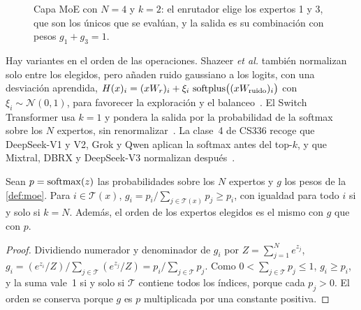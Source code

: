 \begin{figure}[ht]
\centering
{}
\caption{Capa MoE con $N=4$ y $k=2$: el enrutador elige los expertos 1 y 3, que son los únicos que se evalúan, y la salida es su combinación con pesos $g_1+g_3=1$.}
\label{fig:moe}
\end{figure}

Hay variantes en el orden de las operaciones. Shazeer \emph{et al.} también normalizan solo entre los elegidos, pero añaden ruido gaussiano a los logits, con una desviación aprendida, $H(x)_i=(xW_r)_i+\xi_i\,\operatorname{softplus}\bigl((xW_{\mathrm{ruido}})_i\bigr)$ con $\xi_i\sim\mathcal N(0,1)$, para favorecer la exploración y el balanceo~\cite[§2.1]{shazeer2017}. El Switch Transformer usa $k=1$ y pondera la salida por la probabilidad de la softmax sobre los $N$ expertos, sin renormalizar~\cite[§2.1]{switch}. La clase~4 de CS336 recoge que DeepSeek-V1 y V2, Grok y Qwen aplican la softmax antes del top-$k$, y que Mixtral, DBRX y DeepSeek-V3 normalizan después~\cite{cs336}.

\begin{proposicion}[Renormalización]\label{prop:renorm}
Sean $p=\operatorname{softmax}(z)$ las probabilidades sobre los $N$ expertos y $g$ los pesos de la \cref{def:moe}. Para $i\in\mathcal T(x)$, $g_i=p_i/\sum_{j\in\mathcal T(x)}p_j\ge p_i$, con igualdad para todo $i$ si y solo si $k=N$. Además, el orden de los expertos elegidos es el mismo con $g$ que con $p$.
\end{proposicion}

\begin{proof}
Dividiendo numerador y denominador de $g_i$ por $Z=\sum_{j=1}^{N}e^{z_j}$, $g_i=(e^{z_i}/Z)/\sum_{j\in\mathcal T}(e^{z_j}/Z)=p_i/\sum_{j\in\mathcal T}p_j$. Como $0<\sum_{j\in\mathcal T}p_j\le 1$, $g_i\ge p_i$, y la suma vale~1 si y solo si $\mathcal T$ contiene todos los índices, porque cada $p_j>0$. El orden se conserva porque $g$ es $p$ multiplicada por una constante positiva.
\end{proof}

